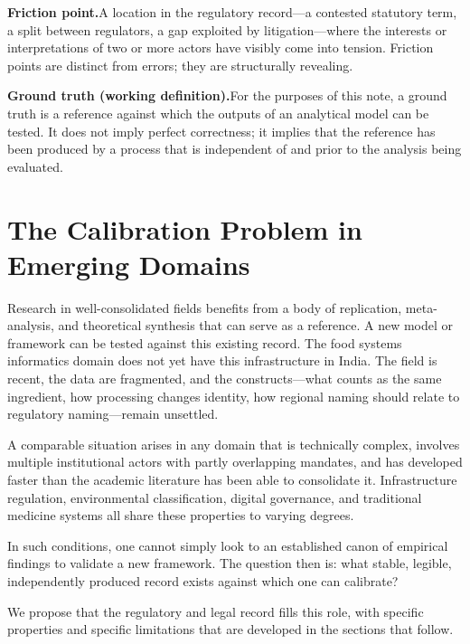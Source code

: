 \documentclass[12pt,a4paper]{article}
\begin{document}
\medskip
\textbf{Friction point.}\enskip A location in the regulatory record---a contested
statutory term, a split between regulators, a gap exploited by litigation---where
the interests or interpretations of two or more actors have visibly come into
tension. Friction points are distinct from errors; they are structurally revealing.

\medskip
\textbf{Ground truth (working definition).}\enskip For the purposes of this note, a
ground truth is a reference against which the outputs of an analytical model can be
tested. It does not imply perfect correctness; it implies that the reference has
been produced by a process that is independent of and prior to the analysis being
evaluated.

\section{The Calibration Problem in Emerging Domains}

Research in well-consolidated fields benefits from a body of replication,
meta-analysis, and theoretical synthesis that can serve as a reference. A new
model or framework can be tested against this existing record. The food systems
informatics domain does not yet have this infrastructure in India. The field is
recent, the data are fragmented, and the constructs---what counts as the same
ingredient, how processing changes identity, how regional naming should relate to
regulatory naming---remain unsettled.

A comparable situation arises in any domain that is technically complex, involves
multiple institutional actors with partly overlapping mandates, and has developed
faster than the academic literature has been able to consolidate it. Infrastructure
regulation, environmental classification, digital governance, and traditional
medicine systems all share these properties to varying degrees.

In such conditions, one cannot simply look to an established canon of empirical
findings to validate a new framework. The question then is: what stable, legible,
independently produced record exists against which one can calibrate?

We propose that the regulatory and legal record fills this role, with specific
properties and specific limitations that are developed in the sections that follow.

\end{document}
